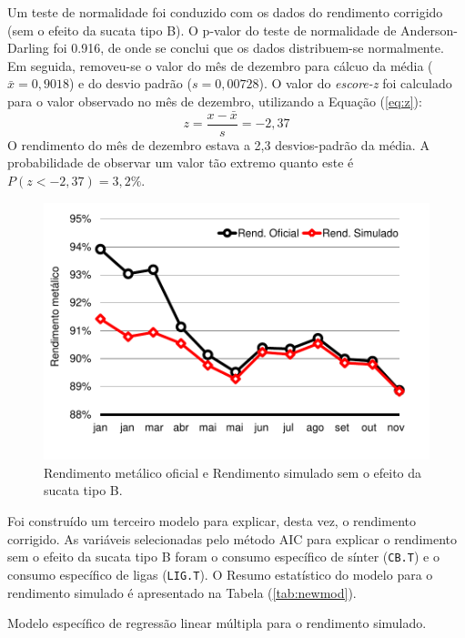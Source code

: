 \begin{multicols}{2}
	Um teste de normalidade foi conduzido com os dados do rendimento corrigido (sem o efeito da sucata tipo B). O p-valor do teste de normalidade de Anderson-Darling foi 0.916, de onde se conclui que os dados distribuem-se normalmente. Em seguida, removeu-se o valor do mês de dezembro para cálcuo da média ($\bar{x} = 0,9018$) e do desvio padrão ($s=0,00728$). O valor do \emph{escore-z} foi calculado para o valor observado no mês de dezembro, utilizando a Equação (\ref{eq:z}):
	\begin{equation}
		\label{eq:z}
		z = \frac{x - \bar{x}}{s} = -2,37
	\end{equation}
	O rendimento do mês de dezembro estava a 2,3 desvios-padrão da média. A probabilidade de observar um valor tão extremo quanto este é $P(z<-2,37)=3,2\%$.
	\begin{figure}[H]
		\centering
		\includegraphics[scale=0.55, bb=0 0 288 432, trim=0in 0in 0in 0in]{figures/fig09-excel.pdf} %
		\caption{Rendimento metálico oficial\cite{rel2} e Rendimento simulado sem o efeito da sucata tipo B.}
		\label{fig:new_rend}
	\end{figure}				
	Foi construído um terceiro modelo para explicar, desta vez, o rendimento corrigido. As variáveis selecionadas pelo método AIC para explicar o rendimento sem o efeito da sucata tipo B foram o consumo específico de sínter (\texttt{CB.T}) e o consumo específico de ligas (\texttt{LIG.T}). O Resumo estatístico do modelo para o rendimento simulado é apresentado na Tabela (\ref{tab:newmod}).
		\begin{table}[H]
	\begin{center}
	\begin{small}
		\caption{Modelo específico de regressão linear múltipla para o rendimento simulado.}

\end{small}
\end{center}
\end{table}
\end{multicols}
